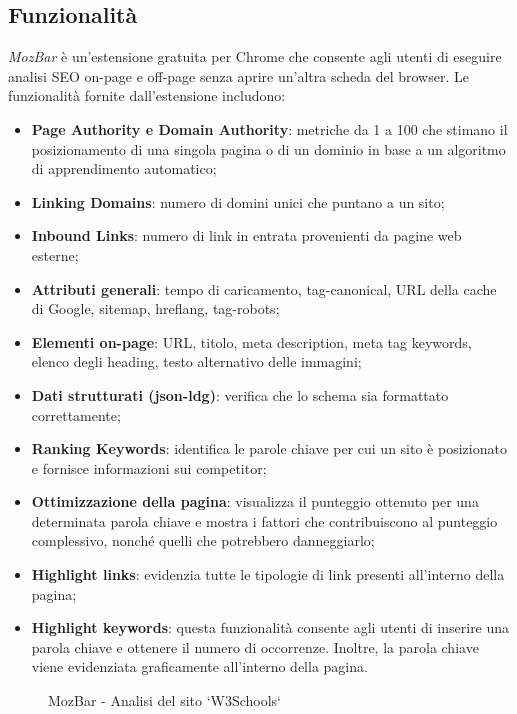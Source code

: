 \subsection{Funzionalità}
\par \textit{MozBar} è un'estensione gratuita per Chrome che consente agli utenti di eseguire analisi SEO \gls{on-page} e \gls{off-page} senza aprire un'altra scheda del browser. Le funzionalità fornite dall'estensione includono:
\begin{itemize}
    \item \textbf{Page Authority e Domain Authority}: metriche da 1 a 100 che stimano il posizionamento di una singola pagina o di un dominio in base a un algoritmo di apprendimento automatico;
    \item \textbf{Linking Domains}: numero di domini unici che puntano a un sito;
    \item \textbf{Inbound Links}: numero di link in entrata provenienti da pagine web esterne;
    \item \textbf{Attributi generali}: tempo di caricamento, \gls{tag-canonical}, URL della cache di Google, \gls{sitemap}, \gls{hreflang}, \gls{tag-robots};
    \item \textbf{Elementi on-page}: URL, titolo, meta description, meta tag keywords, elenco degli heading, testo alternativo delle immagini;
    \item \textbf{Dati strutturati (\gls{json-ldg})}: verifica che lo schema sia formattato correttamente;
    \item \textbf{Ranking Keywords}: identifica le parole chiave per cui un sito è posizionato e fornisce informazioni sui competitor;
    \item \textbf{Ottimizzazione della pagina}: visualizza il punteggio ottenuto per una determinata parola chiave e mostra  i fattori che contribuiscono al punteggio complessivo, nonché quelli che potrebbero danneggiarlo;
    \item \textbf{Highlight links}: evidenzia tutte le tipologie di link presenti all'interno della pagina;
    \item \textbf{Highlight keywords}: questa funzionalità consente agli utenti di inserire una parola chiave e ottenere il numero di occorrenze. Inoltre, la parola chiave viene evidenziata graficamente all'interno della pagina.
\end{itemize}

\begin{figure}[H]
    \centering 
    \caption{MozBar - Analisi del sito `W3Schools`}
\end{figure}


